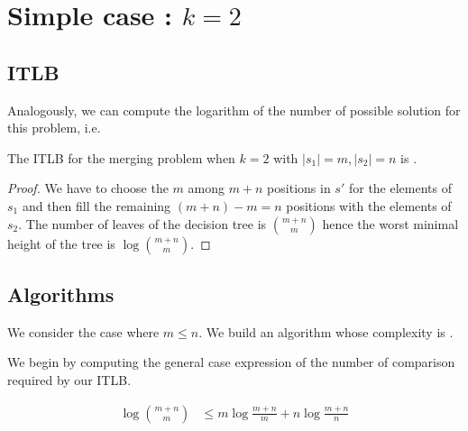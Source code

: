 \section{Simple case : $k=2$}
\label{tree:merging:k=2}

\subsection{ITLB}
\label{tree:merging:k=2:ITLB}

Analogously, we can compute the logarithm of the number of possible solution for this problem, i.e.

\begin{theorem}
The ITLB for the merging problem when $k = 2$ with $|s_1| = m, |s_2| = n$ is .
\end{theorem}

\begin{proof}
We have to choose the $m$ among $m+n$ positions in $s'$ for the elements of $s_1$ and then fill the remaining $(m+n) - m = n$ positions with the elements of $s_2$. The number of leaves of the decision tree is $\binom{m+n}{m}$ hence the worst minimal height of the tree is $\log \binom{m+n}{m}$.
\end{proof}



\subsection{Algorithms}
\label{tree:merging:k=2:alg}

We consider the case where $m \leq n$. We build an algorithm whose complexity is .


We begin by computing the general case expression of the number of comparison required by our ITLB.


\begin{lemma}
\begin{align*}
\log\binom{m+n}{m} &\leq m \log\frac{m+n}{m} + n \log\frac{m+n}{n}\\
\end{align*}
\end{lemma}

